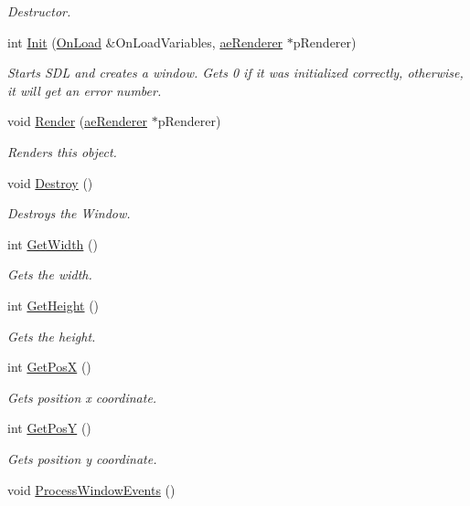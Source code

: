 \begin{DoxyCompactItemize}
\begin{DoxyCompactList}\small\item\em Destructor. \end{DoxyCompactList}\item 
int \hyperlink{classae_core_1_1ae_app_window_a9dc8d3c42a0f4983b5158939f4156f00}{Init} (\hyperlink{structae_core_1_1ae_app_window_1_1_on_load}{On\+Load} \&On\+Load\+Variables, \hyperlink{classae_core_1_1ae_renderer}{ae\+Renderer} $\ast$p\+Renderer)
\begin{DoxyCompactList}\small\item\em Starts S\+DL and creates a window. Gets 0 if it was initialized correctly, otherwise, it will get an error number. \end{DoxyCompactList}\item 
void \hyperlink{classae_core_1_1ae_app_window_af1380617f379039d9d3165af34e2e15c}{Render} (\hyperlink{classae_core_1_1ae_renderer}{ae\+Renderer} $\ast$p\+Renderer)
\begin{DoxyCompactList}\small\item\em Renders this object. \end{DoxyCompactList}\item 
void \hyperlink{classae_core_1_1ae_app_window_ad015b4cd20e3b933ef452bbbacb19883}{Destroy} ()
\begin{DoxyCompactList}\small\item\em Destroys the Window. \end{DoxyCompactList}\item 
int \hyperlink{classae_core_1_1ae_app_window_a605ca0eaea8e88da799e2e7ab9ea6ac4}{Get\+Width} ()
\begin{DoxyCompactList}\small\item\em Gets the width. \end{DoxyCompactList}\item 
int \hyperlink{classae_core_1_1ae_app_window_ad866314100400fcd0c2b55f4cd1593b0}{Get\+Height} ()
\begin{DoxyCompactList}\small\item\em Gets the height. \end{DoxyCompactList}\item 
int \hyperlink{classae_core_1_1ae_app_window_a09c1975c182c6e764d0a28514780e18f}{Get\+PosX} ()
\begin{DoxyCompactList}\small\item\em Gets position x coordinate. \end{DoxyCompactList}\item 
int \hyperlink{classae_core_1_1ae_app_window_a472c4aa17271b0a81dede5110227c324}{Get\+PosY} ()
\begin{DoxyCompactList}\small\item\em Gets position y coordinate. \end{DoxyCompactList}\item 
void \hyperlink{classae_core_1_1ae_app_window_affdc864ae469c97a4b442485b423b4c5}{Process\+Window\+Events} ()\hypertarget{classae_core_1_1ae_app_window_affdc864ae469c97a4b442485b423b4c5}{}\label{classae_core_1_1ae_app_window_affdc864ae469c97a4b442485b423b4c5}


\end{DoxyCompactItemize}
